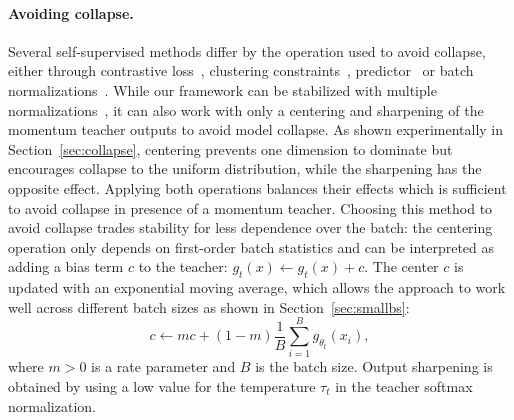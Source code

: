 \paragraph{Avoiding collapse.} 
Several self-supervised methods differ by the operation used to avoid collapse, either through contrastive loss~\cite{wu2018unsupervised}, clustering constraints~\cite{caron2018deep,caron2020unsupervised}, predictor~\cite{grill2020bootstrap} or batch normalizations~\cite{grill2020bootstrap,richemond2020byol}.
While our framework can be stabilized with multiple normalizations~\cite{caron2020unsupervised}, it can also work with only a centering and sharpening of the momentum teacher outputs to avoid model collapse.
As shown experimentally in Section~\ref{sec:collapse}, centering prevents one dimension to dominate but encourages collapse to the uniform distribution, while the sharpening has the opposite effect.
Applying both operations balances their effects which is sufficient to avoid collapse in presence of a momentum teacher.
Choosing this method to avoid collapse trades stability for less dependence over the batch:
the centering operation only depends on first-order batch statistics and can be interpreted as adding a bias term $c$ to the teacher: $g_{t}(x) \leftarrow g_{t}(x) + c$.
The center $c$ is updated with an exponential moving average, which allows the approach to work well across different batch sizes as shown in Section~\ref{sec:smallbs}:
\begin{equation}
c \leftarrow m c + (1-m) \frac{1}{B} \sum_{i=1}^B g_{\theta_t}(x_i),
\label{eq:center_update}
\end{equation}
where $m>0$ is a rate parameter and $B$ is the batch size.
Output sharpening is obtained by using a low value for the temperature $\tau_t$ in the teacher softmax normalization.




